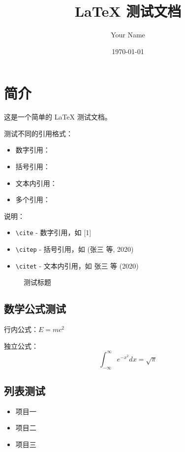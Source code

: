 \documentclass{ctexart}
\title{LaTeX 测试文档}
\author{Your Name}
\date{\today}
\begin{document}
\maketitle

\section{简介}
这是一个简单的 LaTeX \cite{newspaper2021energy}测试文档。

测试不同的引用格式：
\begin{itemize}
    \item 数字引用：\cite{newspaper2021energy}
    \item 括号引用：\citep{newspaper2021energy}
    \item 文本内引用：\citet{newspaper2021energy}
    \item 多个引用：\cite{newspaper2021energy,knuth1984tex}
\end{itemize}

\noindent 说明：
\begin{itemize}
    \item \texttt{\textbackslash cite} - 数字引用，如 [1]
    \item \texttt{\textbackslash citep} - 括号引用，如 (张三 等, 2020)
    \item \texttt{\textbackslash citet} - 文本内引用，如 张三 等 (2020)
\end{itemize}

\begin{figure}[h]
    \centering
    \fbox{\rule{4cm}{3cm}}  %
    \caption{测试标题}
    \label{fig:test}
\end{figure}

\subsection{数学公式测试}
行内公式：$E = mc^2$

独立公式：
\[
\int_{-\infty}^{\infty} e^{-x^2} dx = \sqrt{\pi}
\]

\subsection{列表测试}
\begin{itemize}
    \item 项目一
    \item 项目二
    \item 项目三
\end{itemize}
\end{document}
